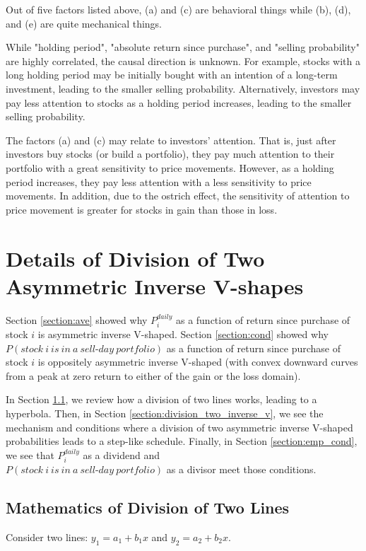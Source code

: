 \documentclass[11pt, a4paper]{article}
\begin{document}
Out of five factors listed above, (a) and (c) are behavioral things while (b), (d), and (e) are quite mechanical things.

While "holding period", "absolute return since purchase", and "selling probability" are highly correlated, the causal direction is unknown. For example, stocks with a long holding period may be initially bought with an intention of a long-term investment, leading to the smaller selling probability. Alternatively, investors may pay less attention to stocks as a holding period increases, leading to the smaller selling probability.


The factors (a) and (c) may relate to investors' attention. That is, just after investors buy stocks (or build a portfolio), they pay much attention to their portfolio with a great sensitivity to price movements. However, as a holding period increases, they pay less attention with a less sensitivity to price movements. In addition, due to the ostrich effect, the sensitivity of attention to price movement is greater for stocks in gain than those in loss. 

\section{Details of Division of Two Asymmetric Inverse V-shapes}
\label{section:condition}
Section \ref{section:ave} showed why $P^{daily}_{i}$ as a function of return since purchase of stock $i$ is asymmetric inverse V-shaped. Section \ref{section:cond} showed why $P(stock~i~is~in~a~sell\mbox{-}day~portfolio)$ as a function of return since purchase of stock $i$ is oppositely asymmetric inverse V-shaped (with convex downward curves from a peak at zero return to either of the gain or the loss domain).

In Section \ref{section:division_two_lines}, we review how a division of two lines works, leading to a hyperbola. Then, in Section \ref{section:division_two_inverse_v}, we see the mechanism and conditions where a division of two asymmetric inverse V-shaped probabilities leads to a step-like schedule. Finally, in Section \ref{section:emp_cond}, we see that $P^{daily}_{i}$ as a dividend and\\ $P(stock~i~is~in~a~sell\mbox{-}day~portfolio)$ as a divisor meet those conditions.

\subsection{Mathematics of Division of Two Lines}
\label{section:division_two_lines}
Consider two lines: $y_1=a_1+b_1x$ and $y_2=a_2+b_2x$.\\
\end{document}
